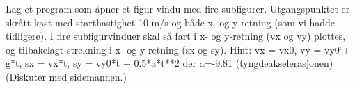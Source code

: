 %
%
Lag et program som åpner et figur-vindu med fire subfigurer. Utgangspunktet er skrått kast med starthastighet 10 m/s og både x- og y-retning (som vi hadde tidligere). I fire subfigurvinduer skal så fart i x- og y-retning (vx og vy) plottes, og tilbakelagt strekning i x- og y-retning (sx og sy). Hint: vx = vx0, vy = vy0`+ g*t, sx = vx*t, sy = vy0*t + 0.5*a*t**2  der a=-9.81 (tyngdeakselerasjonen) (Diskuter med sidemannen.)
